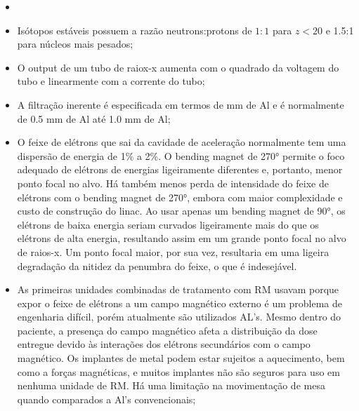 \documentclass[11pt,a4paper]{article}
\newcounter{exemplo}
\begin{document}
\begin{exemplo}[14. IGRT]
    \begin{itemize}
        \item 
    \end{itemize}
\end{exemplo}



\begin{exemplo}[Física]

    \begin{itemize}
        \item Isótopos estáveis possuem a razão neutrons:protons de $1:1$ para $z <  20$ e 1.5:1 para núcleos mais pesados;
        
        \item O output de um tubo de raiox-x aumenta com o quadrado da voltagem do tubo  e linearmente com a corrente do tubo;
        
        \item A filtração inerente é especificada em termos de mm de Al e é normalmente de 0.5 mm de Al até 1.0 mm de Al;
        
        \item O feixe de elétrons que sai da cavidade de aceleração normalmente tem uma dispersão de energia de 1\% a 2\%. O bending magnet de \ang{270} permite o foco adequado de elétrons de energias ligeiramente diferentes e, portanto, menor ponto focal no alvo. Há também menos perda de intensidade do feixe de elétrons com o bending magnet de \ang{270}, embora com maior complexidade e custo de construção do linac. Ao usar apenas um bending magnet de \ang{90}, os elétrons de baixa energia seriam curvados ligeiramente mais do que os elétrons de alta energia, resultando assim em um grande ponto focal no alvo de raios-x. Um ponto focal maior, por sua vez, resultaria em uma ligeira degradação da nitidez da penumbra do feixe, o que é indesejável.
        
        \item As primeiras unidades combinadas de tratamento com RM usavam  porque expor o feixe de elétrons a um campo magnético externo é um problema de engenharia difícil, porém atualmente são utilizados AL's. Mesmo dentro do paciente, a presença do campo magnético afeta a distribuição da dose entregue devido às interações dos elétrons secundários com o campo magnético. Os implantes de metal podem estar sujeitos a aquecimento, bem como a forças magnéticas, e muitos implantes não são seguros para uso em nenhuma unidade de RM. Há uma limitação na movimentação de mesa quando comparados a Al's convencionais;
        

\end{itemize}
\end{exemplo}
\end{document}
